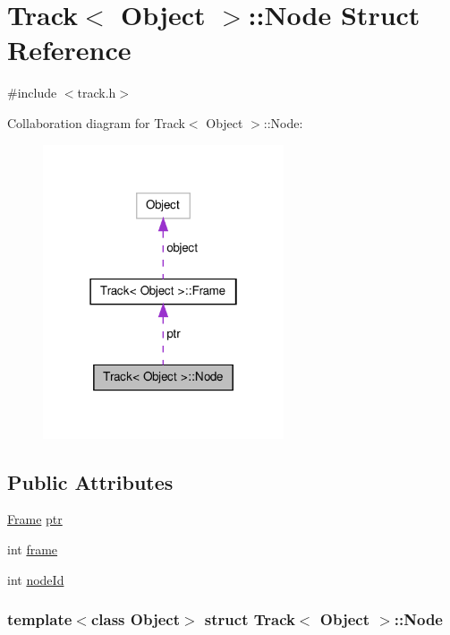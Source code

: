 \hypertarget{struct_track_1_1_node}{\section{\-Track$<$ \-Object $>$\-:\-:\-Node \-Struct \-Reference}
\label{struct_track_1_1_node}
}


{\ttfamily \#include $<$track.\-h$>$}



\-Collaboration diagram for \-Track$<$ \-Object $>$\-:\-:\-Node\-:
\nopagebreak
\begin{figure}[H]
\begin{center}
\leavevmode
\includegraphics[width=202pt]{struct_track_1_1_node__coll__graph}
\end{center}
\end{figure}
\subsection*{\-Public \-Attributes}
\begin{DoxyCompactItemize}
\item 
\hyperlink{struct_track_1_1_frame}{\-Frame} \hyperlink{struct_track_1_1_node_ab2ede054f99dfa482e000894cdc35740}{ptr}
\item 
int \hyperlink{struct_track_1_1_node_ac7729bceaed8d441bfcf81162936e5be}{frame}
\item 
int \hyperlink{struct_track_1_1_node_aa86e28e758e2a6833d09d8653488a553}{node\-Id}
\end{DoxyCompactItemize}
\subsubsection*{template$<$class Object$>$ struct Track$<$ Object $>$\-::\-Node}



